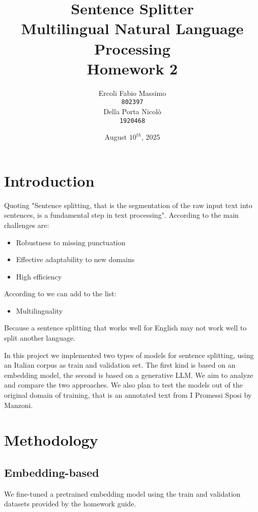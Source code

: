 \documentclass[11pt]{article}
\title{%
	Sentence Splitter\\
	\large Multilingual Natural Language Processing \\
	Homework 2}
\date{August $10^{th}$, 2025}
\author{Ercoli Fabio Massimo \\
\texttt{802397} \\\And
Della Porta Nicolò \\
\texttt{1920468} \\}
\begin{document}
\maketitle

\section{Introduction}

Quoting \cite{redaelli-sprugnoli-2024-sentence} "Sentence splitting, that is the segmentation of the raw input text into sentences, is a fundamental step in text processing".  According to \cite{frohmann2024segmenttextuniversalapproach} the main challenges are:

\begin{itemize}
	\item Robustness to missing punctuation
	\item Effective adaptability to new domains
	\item High efficiency
\end{itemize}

According to \cite{redaelli-sprugnoli-2024-sentence} we can add to the list:

\begin{itemize}
	\item Multilinguality
\end{itemize}

Because a sentence splitting that works well for English may not work well to split another language.

In this project we implemented two types of models for sentence splitting, using an Italian corpus as train and validation set.
The first kind is based on an embedding model, the second is based on a generative LLM.
We aim to analyze and compare the two approaches. 
We also plan to test the models out of the original domain of training, that is an annotated text from I Promessi Sposi by Manzoni.

\section{Methodology}

\subsection{Embedding-based}

We fine-tuned a pretrained embedding model using the train and validation datasets provided by the homework guide.
\end{document}
